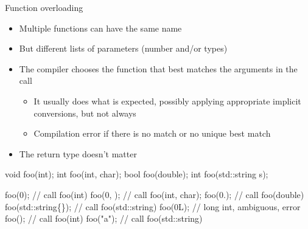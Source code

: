 \begin{frame}[fragile]{Function overloading}

  \begin{itemize}
  \item Multiple functions can have the same name
  \item But different lists of parameters (number and/or types)
  \item The compiler chooses the function that best matches the arguments in
    the call
    \begin{itemize}
    \item It usually does what is expected, possibly applying appropriate
      implicit conversions, but not always
    \item Compilation error if there is no match or no unique best match
    \end{itemize}
  \item The return type doesn't matter
  \end{itemize}

  \begin{codeblock}
void foo(int);
int  foo(int, char);
bool foo(double);
int  foo(std::string s);

foo(0);             // call foo(int)
foo(0, );        // call foo(int, char);
foo(0.);            // call foo(double)
foo(std::string\{\}); // call foo(std::string)
foo(0L);            // long int, ambiguous, error
foo();           // call foo(int)
foo("a");           // call foo(std::string)\end{codeblock}

\end{frame}

